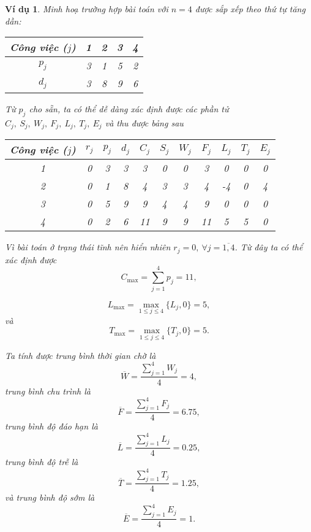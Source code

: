 \documentclass[12pt,a4paper]{report}
\newtheorem{vd}{Ví dụ}
\begin{document}
\begin{vd}
	Minh hoạ trường hợp bài toán với $n=4$ được sắp xếp theo thứ tự tăng dần:
	\begin{table}[h!]
		\centering
		 \begin{tabular}{|c | c c c c |} 
		 \hline
		 Công việc ($j$) & 1 & 2 & 3 & 4 \\
		 \hline\hline
		 $p_j$ & 3 & 1 & 5 & 2 \\
		 $d_j$ & 3 & 8 & 9 & 6 \\
		 \hline
		 \end{tabular}
	\end{table}

	Từ $p_j$ cho sẵn, ta có thể dễ dàng xác định được các phần tử $C_j, \: S_j, \: W_j, \: F_j, \: L_j, \: T_j, \: E_j$ và thu được bảng sau
\begin{table}[h!]
		\centering
		 \begin{tabular}{|c || c c c c c c c c c c|}
		 \hline
		 Công việc ($j$) & $r_j$ & $p_j$ & $d_j$ & $C_j$ & $S_j$ & $W_j$ & $F_j$ & $L_j$ & $T_j$ & $E_j$ \\
		 \hline
		 1 & 0 & 3 & 3 & 3 & 0 & 0 & 3 & 0 & 0 & 0 \\
		 \hline
		 2 & 0 & 1 & 8 & 4 & 3 & 3 & 4 & -4 & 0 & 4 \\
		 \hline
		 3 & 0 & 5 & 9 & 9 & 4 & 4 & 9 & 0 & 0 & 0 \\
		 \hline
		 4 & 0 & 2 & 6 & 11 & 9 & 9 & 11 & 5 & 5 & 0 \\
		 \hline
		 \end{tabular}
	\end{table}

Vì bài toán ở trạng thái tĩnh nên hiển nhiên $r_j = 0, \: \forall j=\overline{1,4}$. Từ đây ta có thể xác định được
\begin{equation*}
C_{\max} = \sum_{j=1}^4 p_j = 11,
\end{equation*}

\begin{equation*}
	L_{\max} = \max _{1 \leq j \leq 4} \{L_j, 0\} = 5,
\end{equation*}
và
\begin{equation*}
	T_{\max} = \max _{1 \leq j \leq 4} \{T_j, 0\} = 5.
\end{equation*}

Ta tính được trung bình thời gian chờ là
\begin{equation*}
\overline{W} = \frac{\sum_{j=1}^4 W_j}{4} = 4,
\end{equation*}
trung bình chu trình là
\begin{equation*}
\overline{F} = \frac{\sum_{j=1}^4 F_j}{4} = 6.75,
\end{equation*}
trung bình độ đáo hạn là
\begin{equation*}
\overline{L} = \frac{\sum_{j=1}^4 L_j}{4} = 0.25,
\end{equation*}
trung bình độ trễ là
\begin{equation*}
\overline{T} = \frac{\sum_{j=1}^4 T_j}{4} = 1.25,
\end{equation*}
và trung bình độ sớm là
\begin{equation*}
\overline{E} = \frac{\sum_{j=1}^4 E_j}{4} = 1.
\end{equation*}
\end{vd}
\end{document}
